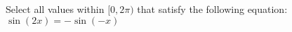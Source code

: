 \documentclass{ximera}
\author{David Kish}
\begin{document}
\begin{exercise}
Select all values within $[0,2\pi)$ that satisfy the following equation:\\
$\sin(2x) = -\sin(-x)$ \\
\begin{selectAll}
\choice{$\pi$}
\end{selectAll}
\end{exercise}
\end{document}

